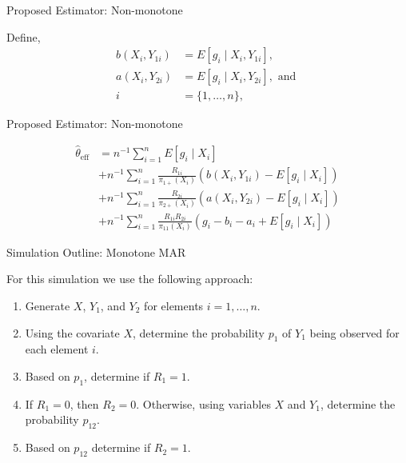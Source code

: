 \documentclass{beamer} %
\begin{document}
\begin{frame}{Proposed Estimator: Non-monotone}
  
  Define,
\begin{align*}
b(X_i, Y_{1i}) &= E[g_i \mid X_i, Y_{1i}], \\ 
a(X_i, Y_{2i}) &= E[g_i \mid X_i, Y_{2i}], \text{ and } \\
i &= \{1, \dots, n\},
\end{align*}

\end{frame}

\begin{frame}{Proposed Estimator: Non-monotone}

\begin{align*}
\hat \theta_{\text{eff}} &= n^{-1} \sum_{i = 1}^n E[g_i \mid X_i] \\ 
&+ n^{-1} \sum_{i = 1}^n \frac{R_{1i}}{\pi_{1+}(X_i)}(b(X_i, Y_{1i}) - E[g_i \mid X_i]) \\ 
&+ n^{-1} \sum_{i = 1}^n \frac{R_{2i}}{\pi_{2+}(X_i)}(a(X_i, Y_{2i}) - E[g_i \mid X_i]) \\ 
&+ n^{-1} \sum_{i = 1}^n \frac{R_{1i} R_{2i}}{\pi_{11}(X_i)}(g_i - b_i - a_i + E[g_i \mid X_i])
\end{align*}

\end{frame}

\begin{frame}{Simulation Outline: Monotone MAR}

  For this simulation we use the following approach:
  \begin{enumerate}
      \item Generate $X$, $Y_1$, and $Y_2$ for elements $i = 1, \dots, n$.
      \item Using the covariate $X$, determine the probability $p_1$ of $Y_1$
      being observed for each element $i$.
      \item Based on $p_1$, determine if $R_1 = 1$.
      \item If $R_1 = 0$, then $R_2 = 0$. Otherwise, using variables $X$ and
        $Y_1$, determine the probability $p_{12}$.
      \item Based on $p_{12}$ determine if $R_2 = 1$.
  \end{enumerate}
\end{frame}
  
\end{document}
